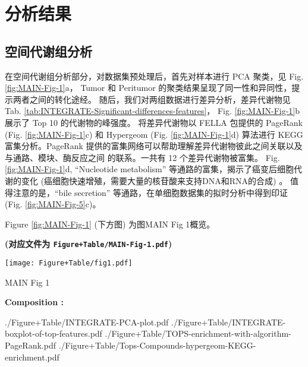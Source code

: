 \documentclass[
]{article}
\begin{document}
\hypertarget{results}{%
\section{分析结果}\label{results}}

\hypertarget{ux7a7aux95f4ux4ee3ux8c22ux7ec4ux5206ux6790}{%
\subsection{空间代谢组分析}\label{ux7a7aux95f4ux4ee3ux8c22ux7ec4ux5206ux6790}}

在空间代谢组分析部分，对数据集预处理后，首先对样本进行 PCA 聚类，见 Fig. \ref{fig:MAIN-Fig-1}a，
Tumor 和 Peritumor 的聚类结果呈现了同一性和异同性，提示两者之间的转化途经。
随后，我们对两组数据进行差异分析，差异代谢物见 Tab. \ref{tab:INTEGRATE-Significant-differences-features}，
Fig. \ref{fig:MAIN-Fig-1}b 展示了 Top 10 的代谢物的峰强度。
将差异代谢物以 FELLA 包提供的 PageRank (Fig. \ref{fig:MAIN-Fig-1}c) 和 Hypergeom (Fig. \ref{fig:MAIN-Fig-1}d)
算法进行 KEGG 富集分析。PageRank 提供的富集网络可以帮助理解差异代谢物彼此之间关联以及与通路、模块、酶反应之间
的联系。一共有 12 个差异代谢物被富集。
Fig. \ref{fig:MAIN-Fig-1}d, ``Nucleotide metabolism'' 等通路的富集，揭示了癌变后细胞代谢的变化
(癌细胞快速增殖，需要大量的核苷酸来支持DNA和RNA的合成) 。
值得注意的是，``bile secretion'' 等通路，在单细胞数据集的拟时分析中得到印证 (Fig. \ref{fig:MAIN-Fig-5}c)。

\begin{center}\vspace{1.5cm}\end{center}

Figure \ref{fig:MAIN-Fig-1} (下方图) 为图MAIN Fig 1概览。

\textbf{(对应文件为 \texttt{Figure+Table/MAIN-Fig-1.pdf})}

\def\@captype{figure}
\begin{center}
\texttt{[image: Figure+Table/fig1.pdf]}
\caption{MAIN Fig 1}\label{fig:MAIN-Fig-1}
\end{center}
\begin{center}\begin{tcolorbox}[colback=gray!10, colframe=gray!50, width=0.9\linewidth, arc=1mm, boxrule=0.5pt]
\textbf{
Composition
:}

\vspace{0.5em}

    ./Figure+Table/INTEGRATE-PCA-plot.pdf \newline
./Figure+Table/INTEGRATE-boxplot-of-top-features.pdf
\newline
./Figure+Table/TOPS-enrichment-with-algorithm-PageRank.pdf
\newline
./Figure+Table/Tops-Compounds-hypergeom-KEGG-enrichment.pdf

\vspace{2em}
\end{tcolorbox}
\end{center}
\end{document}

